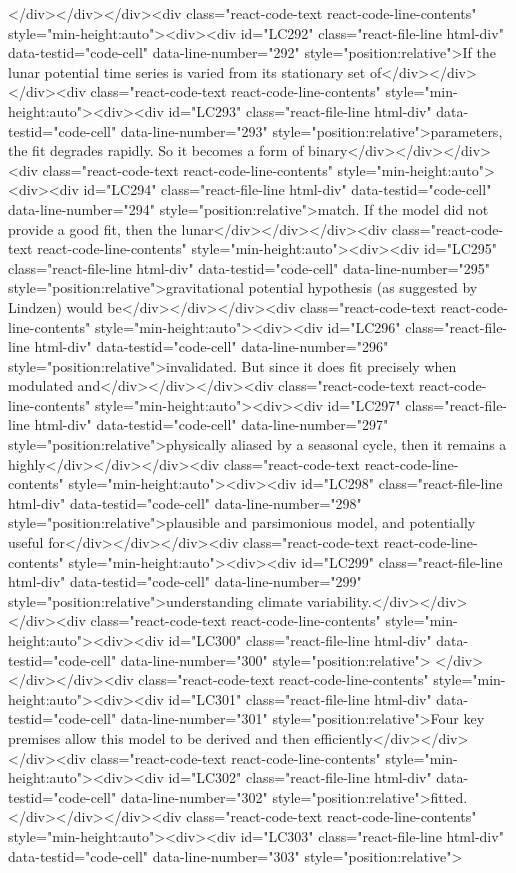 {{</div></div></div><div class="react-code-text react-code-line-contents" style="min-height:auto"><div><div id="LC292" class="react-file-line html-div" data-testid="code-cell" data-line-number="292" style="position:relative">If the lunar potential time series is varied from its stationary set of</div></div></div><div class="react-code-text react-code-line-contents" style="min-height:auto"><div><div id="LC293" class="react-file-line html-div" data-testid="code-cell" data-line-number="293" style="position:relative">parameters, the fit degrades rapidly. So it becomes a form of binary</div></div></div><div class="react-code-text react-code-line-contents" style="min-height:auto"><div><div id="LC294" class="react-file-line html-div" data-testid="code-cell" data-line-number="294" style="position:relative">match. If the model did not provide a good fit, then the lunar</div></div></div><div class="react-code-text react-code-line-contents" style="min-height:auto"><div><div id="LC295" class="react-file-line html-div" data-testid="code-cell" data-line-number="295" style="position:relative">gravitational potential hypothesis (as suggested by Lindzen) would be</div></div></div><div class="react-code-text react-code-line-contents" style="min-height:auto"><div><div id="LC296" class="react-file-line html-div" data-testid="code-cell" data-line-number="296" style="position:relative">invalidated. But since it does fit precisely when modulated and</div></div></div><div class="react-code-text react-code-line-contents" style="min-height:auto"><div><div id="LC297" class="react-file-line html-div" data-testid="code-cell" data-line-number="297" style="position:relative">physically aliased by a seasonal cycle, then it remains a highly</div></div></div><div class="react-code-text react-code-line-contents" style="min-height:auto"><div><div id="LC298" class="react-file-line html-div" data-testid="code-cell" data-line-number="298" style="position:relative">plausible and parsimonious model, and potentially useful for</div></div></div><div class="react-code-text react-code-line-contents" style="min-height:auto"><div><div id="LC299" class="react-file-line html-div" data-testid="code-cell" data-line-number="299" style="position:relative">understanding climate variability.</div></div></div><div class="react-code-text react-code-line-contents" style="min-height:auto"><div><div id="LC300" class="react-file-line html-div" data-testid="code-cell" data-line-number="300" style="position:relative">
</div></div></div><div class="react-code-text react-code-line-contents" style="min-height:auto"><div><div id="LC301" class="react-file-line html-div" data-testid="code-cell" data-line-number="301" style="position:relative">Four key premises allow this model to be derived and then efficiently</div></div></div><div class="react-code-text react-code-line-contents" style="min-height:auto"><div><div id="LC302" class="react-file-line html-div" data-testid="code-cell" data-line-number="302" style="position:relative">fitted.</div></div></div><div class="react-code-text react-code-line-contents" style="min-height:auto"><div><div id="LC303" class="react-file-line html-div" data-testid="code-cell" data-line-number="303" style="position:relative">
}}
